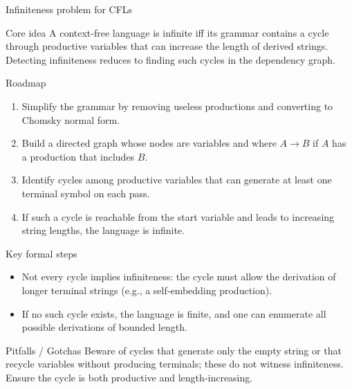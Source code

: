 \begin{frame}[t]{Infiniteness problem for CFLs}
  \begin{tblock}{Core idea}
    A context‑free language is infinite iff its grammar contains a cycle
    through productive variables that can increase the length of derived
    strings.  Detecting infiniteness reduces to finding such cycles in
    the dependency graph.
  \end{tblock}
  \begin{tblock}{Roadmap}
    \begin{enumerate}
      \item Simplify the grammar by removing useless productions and
        converting to Chomsky normal form.
      \item Build a directed graph whose nodes are variables and where
        $A \to B$ if $A$ has a production that includes $B$.
      \item Identify cycles among productive variables that can
        generate at least one terminal symbol on each pass.
      \item If such a cycle is reachable from the start variable and
        leads to increasing string lengths, the language is infinite.
    \end{enumerate}
  \end{tblock}
  \begin{tblock}{Key formal steps}
    \begin{itemize}
      \item Not every cycle implies infiniteness: the cycle must allow
        the derivation of longer terminal strings (e.g., a self‑embedding
        production).
      \item If no such cycle exists, the language is finite, and one
        can enumerate all possible derivations of bounded length.
    \end{itemize}
  \end{tblock}
  \begin{talert}{Pitfalls / Gotchas}
    Beware of cycles that generate only the empty string or that
    recycle variables without producing terminals; these do not witness
    infiniteness.  Ensure the cycle is both productive and length‑increasing.
  \end{talert}
  \label{fr:6.3-07}
\end{frame}

